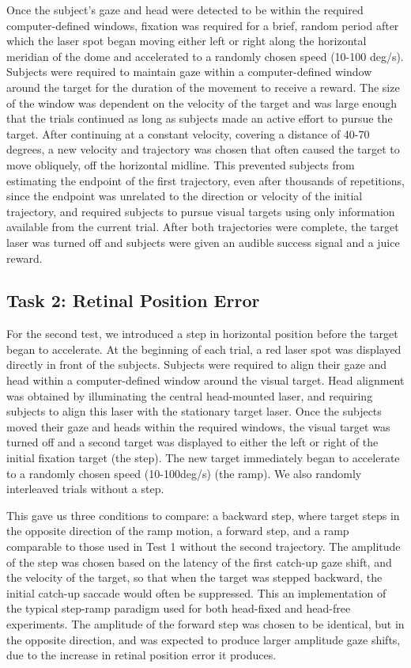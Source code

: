\documentclass[12pt]{article}
\begin{document}
Once the subject’s gaze and head were detected to be within the required computer-defined windows, fixation was required for a brief, random period after which the laser spot began moving either left or right along the horizontal meridian of the dome and accelerated to a randomly chosen speed (10-100 deg/s). Subjects were required to maintain gaze within a computer-defined window around the target for the duration of the movement to receive a reward. The size of the window was dependent on the velocity of the target and was large enough that the trials continued as long as subjects made an active effort to pursue the target. After continuing at a constant velocity, covering a distance of 40-70 degrees, a new velocity and trajectory was chosen that often caused the target to move obliquely, off the horizontal midline. This prevented subjects from estimating the endpoint of the first trajectory, even after thousands of repetitions, since the endpoint was unrelated to the direction or velocity of the initial trajectory, and required subjects to pursue visual targets using only information available from the current trial. After both trajectories were complete, the target laser was turned off and subjects were given an audible success signal and a juice reward. 

\subsection{Task 2: Retinal Position Error}
For the second test, we introduced a step in horizontal position before the target began to accelerate. At the beginning of each trial, a red laser spot was displayed directly in front of the subjects. Subjects were required to align their gaze and head within a computer-defined window around the visual target. Head alignment was obtained by illuminating the central head-mounted laser, and requiring subjects to align this laser with the stationary target laser. Once the subjects moved their gaze and heads within the required windows, the visual target was turned off and a second target was displayed to either the left or right of the initial fixation target (the step). The new target immediately began to accelerate to a randomly chosen speed (10-100deg/s) (the ramp). We also randomly interleaved trials without a step. 

This gave us three conditions to compare: a backward step, where target steps in the opposite direction of the ramp motion, a forward step, and a ramp comparable to those used in Test 1 without the second trajectory. The amplitude of the step was chosen based on the latency of the first catch-up gaze shift, and the velocity of the target, so that when the target was stepped backward, the initial catch-up saccade would often be suppressed. This an implementation of the typical step-ramp paradigm used for both head-fixed and head-free experiments. The amplitude of the forward step was chosen to be identical, but in the opposite direction, and was expected to produce larger amplitude gaze shifts, due to the increase in retinal position error it produces.
\end{document}
